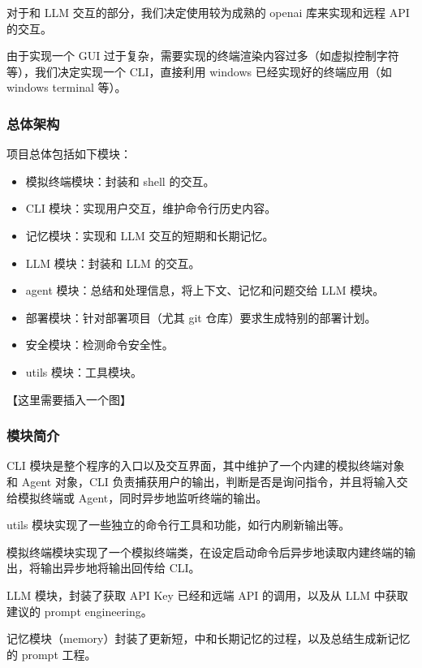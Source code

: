 \documentclass{article}
\theoremstyle{plain}
\theoremstyle{definition}
\theoremstyle{remark}
\begin{document}
对于和 LLM 交互的部分，我们决定使用较为成熟的 openai 库来实现和远程 API 的交互。

由于实现一个 GUI 过于复杂，需要实现的终端渲染内容过多（如虚拟控制字符等），我们决定实现一个 CLI，直接利用 windows 已经实现好的终端应用（如 windows terminal 等）。

\subsubsection{总体架构}

项目总体包括如下模块：

\begin{itemize}
    \setlength{\itemsep}{0.1em}
    \setlength{\parskip}{0.1em}
    \item 模拟终端模块：封装和 shell 的交互。
    \item CLI 模块：实现用户交互，维护命令行历史内容。
    \item 记忆模块：实现和 LLM 交互的短期和长期记忆。
    \item LLM 模块：封装和 LLM 的交互。
    \item agent 模块：总结和处理信息，将上下文、记忆和问题交给 LLM 模块。
    \item 部署模块：针对部署项目（尤其 git 仓库）要求生成特别的部署计划。
    \item 安全模块：检测命令安全性。
    \item utils 模块：工具模块。
\end{itemize}

【这里需要插入一个图】

\subsubsection{模块简介}

CLI 模块是整个程序的入口以及交互界面，其中维护了一个内建的模拟终端对象和 Agent 对象，CLI 负责捕获用户的输出，判断是否是询问指令，并且将输入交给模拟终端或 Agent，同时异步地监听终端的输出。

utils 模块实现了一些独立的命令行工具和功能，如行内刷新输出等。

模拟终端模块实现了一个模拟终端类，在设定启动命令后异步地读取内建终端的输出，将输出异步地将输出回传给 CLI。

LLM 模块，封装了获取 API Key 已经和远端 API 的调用，以及从 LLM 中获取建议的 prompt engineering。

记忆模块（memory）封装了更新短，中和长期记忆的过程，以及总结生成新记忆的 prompt 工程。
\end{document}
